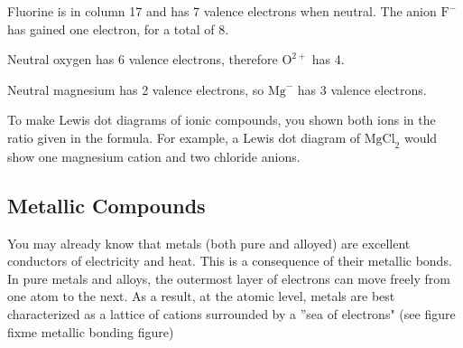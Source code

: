 Fluorine is in column 17 and has 7 valence electrons when neutral. The anion 
$\text{F}^-$ has gained one electron, for a total of 8. 

\begin{center}
\end{center}

Neutral oxygen has 6 valence electrons, therefore $\text{O}^{2+}$ has 4. 
\begin{center}
\end{center}

Neutral magnesium has 2 valence electrons, so $\text{Mg}^{-}$ has 3 valence 
electrons. 
\begin{center}
\end{center}

To make Lewis dot diagrams of ionic compounds, you shown both ions in the ratio 
given in the formula. For example, a Lewis dot diagram of $\text{MgCl}_2$ would 
show one magnesium cation and two chloride anions. 

\subsection{Metallic Compounds}
You may already know that metals (both pure and alloyed) are excellent conductors 
of electricity and heat. This is a consequence of their metallic bonds. In pure 
metals and alloys, the outermost layer of electrons can move freely from one atom 
to the next. As a result, at the atomic level, metals are best characterized as a 
lattice of cations surrounded by a ''sea of electrons" (see figure	fixme metallic bonding figure)

